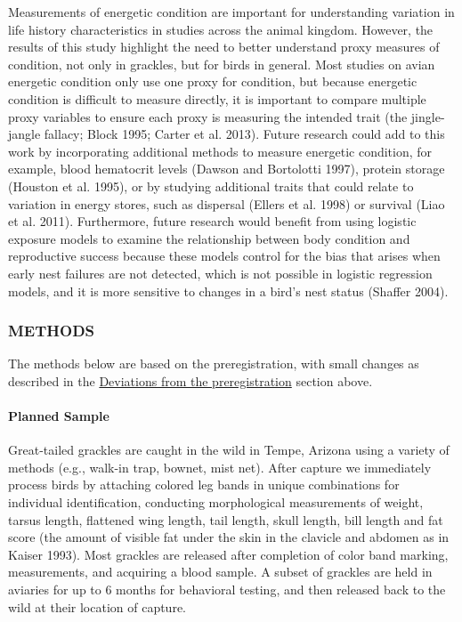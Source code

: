 \documentclass[
]{article}
\begin{document}
Measurements of energetic condition are important for understanding
variation in life history characteristics in studies across the animal
kingdom. However, the results of this study highlight the need to better
understand proxy measures of condition, not only in grackles, but for
birds in general. Most studies on avian energetic condition only use one
proxy for condition, but because energetic condition is difficult to
measure directly, it is important to compare multiple proxy variables to
ensure each proxy is measuring the intended trait (the jingle-jangle
fallacy; Block 1995; Carter et al. 2013). Future research could add to
this work by incorporating additional methods to measure energetic
condition, for example, blood hematocrit levels (Dawson and Bortolotti
1997), protein storage (Houston et al. 1995), or by studying additional
traits that could relate to variation in energy stores, such as
dispersal (Ellers et al. 1998) or survival (Liao et al. 2011).
Furthermore, future research would benefit from using logistic exposure
models to examine the relationship between body condition and
reproductive success because these models control for the bias that
arises when early nest failures are not detected, which is not possible
in logistic regression models, and it is more sensitive to changes in a
bird's nest status (Shaffer 2004).

\pagebreak

\hypertarget{methods}{%
\subsubsection{METHODS}\label{methods}}

The methods below are based on the preregistration, with small changes
as described in the
\protect\hyperlink{associated-preregistration}{Deviations from the
preregistration} section above.

\hypertarget{planned-sample}{%
\paragraph{\texorpdfstring{\textbf{Planned
Sample}}{Planned Sample}}\label{planned-sample}}

Great-tailed grackles are caught in the wild in Tempe, Arizona using a
variety of methods (e.g., walk-in trap, bownet, mist net). After capture
we immediately process birds by attaching colored leg bands in unique
combinations for individual identification, conducting morphological
measurements of weight, tarsus length, flattened wing length, tail
length, skull length, bill length and fat score (the amount of visible
fat under the skin in the clavicle and abdomen as in Kaiser 1993). Most
grackles are released after completion of color band marking,
measurements, and acquiring a blood sample. A subset of grackles are
held in aviaries for up to 6 months for behavioral testing, and then
released back to the wild at their location of capture.
\end{document}
